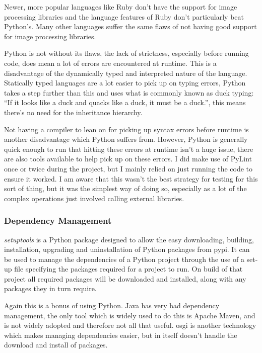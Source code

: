 Newer, more popular languages like Ruby don't have the support for image processing libraries and
the language features of Ruby don't particularly beat Python's. Many other languages suffer the
same flaws of not having good support for image processing libraries.

Python is not without its flaws, the lack of strictness, especially before running code, does mean
a lot of errors are encountered at runtime. This is a disadvantage of the dynamically typed and
interpreted nature of the language. Statically typed languages are a lot easier to pick up on
typing errors, Python takes a step further than this and uses what is commonly known as duck
typing: ``If it looks like a duck and quacks like a duck, it must be a duck.''\cite{2013Glossary},
this means there's no need for the inheritance hierarchy. 

Not having a compiler to lean on for picking up syntax errors before runtime is another
disadvantage which Python suffers from. However, Python is generally quick enough to run that 
hitting these errors at runtime isn't a huge issue, there are also tools available to help pick up
on these errors. I did make use of PyLint once or twice during the project, but I mainly relied on
just running the code to ensure it worked. I am aware that this wasn't the best strategy for 
testing for this sort of thing, but it was the simplest way of doing so, especially as a lot of
the complex operations just involved calling external libraries.


\subsubsection{Dependency Management}
\emph{setuptools} is a Python package designed to allow the easy downloading, building, 
installation, upgrading and uninstallation of Python packages from \gls{pypi}. It can be used to
manage the dependencies of a Python project through the use of a set-up file specifying the 
packages required for a project to run. On build of that project all required packages will be 
downloaded and installed, along with any packages they in turn require.

Again this is a bonus of using Python. Java has very bad dependency management, the only tool
which is widely used to do this is Apache Maven, and is not widely adopted and therefore not all
that useful. \Gls{osgi} is another technology which makes managing dependencies easier, but in 
itself doesn't handle the download and install of packages.

